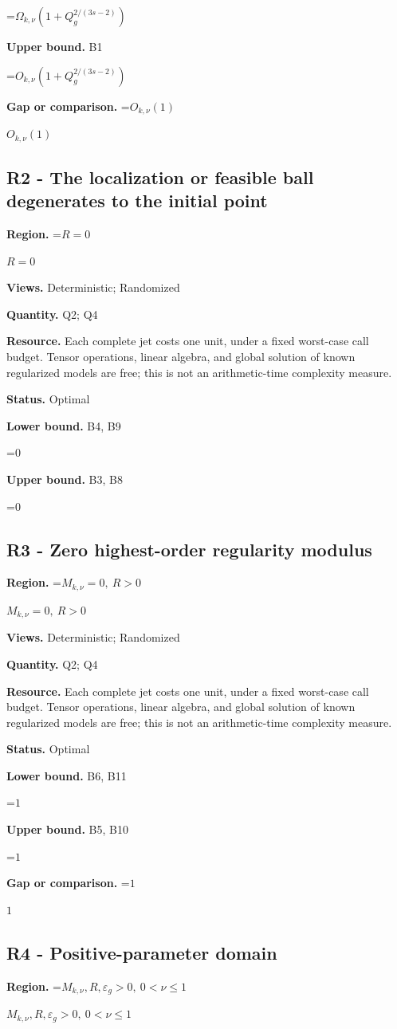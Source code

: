 \documentclass[10pt,a4paper]{article}
\newcommand{\AtlasMath}[1]{\par\begingroup\centering\setbox0=\hbox{$\displaystyle #1$}\ifdim\wd0>1.4\linewidth\typeout{ATLAS WIDE FORMULA: \the\wd0}\fi\ifdim\wd0>\linewidth\resizebox{\linewidth}{!}{\box0}\else\box0\fi\par\endgroup}
\newcommand{\AtlasInlineMath}[1]{\begingroup\setbox0=\hbox{$#1$}\ifdim\wd0>.4\linewidth\endgroup\AtlasMath{#1}\else\endgroup$#1$\fi}
\begin{document}
\AtlasMath{\Omega_{k,\nu}(1+Q_g^{2/(3s-2)})}
\textbf{Upper bound.} B1

\AtlasMath{O_{k,\nu}(1+Q_g^{2/(3s-2)})}
\textbf{Gap or comparison.} \AtlasInlineMath{O_{k,\nu}(1)}

\subsection{R2 - The localization or feasible ball degenerates to the initial point}
\textbf{Region.} \AtlasInlineMath{R=0}

\textbf{Views.} Deterministic; Randomized

\textbf{Quantity.} Q2; Q4

\textbf{Resource.} Each complete jet costs one unit, under a fixed worst-case call budget. Tensor operations, linear algebra, and global solution of known regularized models are free; this is not an arithmetic-time complexity measure.

\textbf{Status.} Optimal

\textbf{Lower bound.} B4, B9

\AtlasMath{0}
\textbf{Upper bound.} B3, B8

\AtlasMath{0}
\subsection{R3 - Zero highest-order regularity modulus}
\textbf{Region.} \AtlasInlineMath{M_{k,\nu}=0,\ R>0}

\textbf{Views.} Deterministic; Randomized

\textbf{Quantity.} Q2; Q4

\textbf{Resource.} Each complete jet costs one unit, under a fixed worst-case call budget. Tensor operations, linear algebra, and global solution of known regularized models are free; this is not an arithmetic-time complexity measure.

\textbf{Status.} Optimal

\textbf{Lower bound.} B6, B11

\AtlasMath{1}
\textbf{Upper bound.} B5, B10

\AtlasMath{1}
\textbf{Gap or comparison.} \AtlasInlineMath{1}

\subsection{R4 - Positive-parameter domain}
\textbf{Region.} \AtlasInlineMath{M_{k,\nu},R,\varepsilon_g>0,\ 0<\nu\le1}
\end{document}
